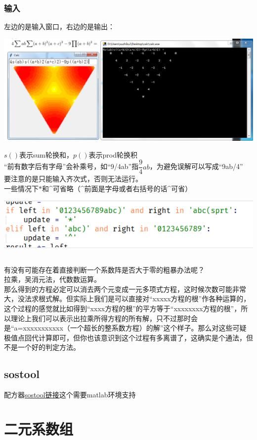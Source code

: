 \documentclass[UTF8]{ctexart}
\begin{document}
\subsubsection{输入}
左边的是输入窗口，右边的是输出：
\begin{center}
	\includegraphics[width=0.85\linewidth]{z03}
\end{center}
$ s() $表示sum轮换和，$ p() $表示prod轮换积\\
“前有数字后有字母”会补乘号，如“9/4ab”指$ \dfrac{9}{4}ab $，为避免误解可以写成“9ab/4”\\
要注意的是只能输入齐次式，否则无法运行。\\
一些情况下$ * $和\^{}可省略（\^{}前面是字母或者右括号的话\^{}可省）
\begin{center}
	\includegraphics[width=0.5\linewidth]{z02}
\end{center}
\subsection{}
有没有可能存在着直接判断一个系数阵是否大于零的粗暴办法呢？\\
拉乘，吴消元法，代数数运算。\\
那么得到的方程必定可以消去两个元变成一元多项式方程，这时候次数可能非常大，没法求根式解。但实际上我们是可以直接对“xxxxx方程的根”作各种运算的，这个过程的感觉就比如得到“xxxx方程的根”的平方等于“xxxxxxxx方程的根”，所以理论上我们可以表示出拉乘所得方程的所有解，只不过那时会是“a=xxxxxxxxxxx（一个超长的整系数方程）的解”这个样子。那么对这些可疑极值点回代计算即可，但你也该意识到这个过程有多离谱了，这确实是个通法，但不是一个好的判定方法。
\subsection{sostool}
配方器\href{https://www.mit.edu/~parrilo/sostools/}{sostool链接}这个需要matlab环境支持
\section{二元系数组}
\end{document}
